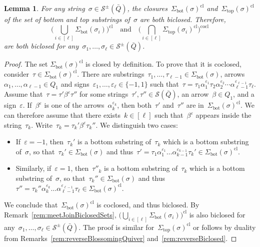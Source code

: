 \documentclass{amsart}
\newtheorem{lemma}[theorem]{Lemma}
\theoremstyle{definition}
\newcommand{\strings}{\mathcal{S}} %
\renewcommand{\top}{\mathrm{top}} %
\newcommand{\bottom}{\mathrm{bot}} %
\newcommand{\closure}[1]{#1^{\mathrm{cl}}} %
\newcommand{\coclosure}[1]{#1^{\mathrm{cocl}}} %
\begin{document}
\begin{lemma}
\label{lem:exmBiclosed}
For any string~$\sigma \in \strings^\pm(\bar Q)$, the closures~$\closure{\Sigma_\bottom(\sigma)}$ and~$\closure{\Sigma_\top(\sigma)}$ of the set of bottom and top substrings of~$\sigma$ are both biclosed.
Therefore,
\[
\closure{\Big( \bigcup_{i \in [\ell]} \Sigma_\bottom(\sigma_i) \Big)}
\quad\text{and}\quad
\coclosure{\Big( \bigcap_{i \in [\ell]} \closure{\Sigma_\top(\sigma_i)} \Big)}
\]
are both biclosed for any~$\sigma_1, \dots, \sigma_\ell \in \strings^\pm(\bar Q)$.
\end{lemma}

\begin{proof}
The set $\closure{\Sigma_\bottom(\sigma)}$ is closed by definition.
To prove that it is coclosed, consider~${\tau \in \closure{\Sigma_\bottom(\sigma)}}$.
There are substrings~$\tau_1, \dots, \tau_{\ell-1} \in \Sigma_\bottom(\sigma)$, arrows~$\alpha_1, \dots, \alpha_{\ell-1} \in Q_1$ and signs~${\varepsilon_1, \dots, \varepsilon_\ell \in \{-1,1\}}$ such that~$\tau = \tau_1 \alpha_1^{\varepsilon_1} \tau_2 \alpha_2^{\varepsilon_2} \cdots \alpha_{\ell-1}^{\varepsilon_{\ell-1}} \tau_\ell$.
Assume that~$\tau = \tau' \beta^\varepsilon \tau''$ for some strings~$\tau', \tau'' \in \strings(\bar Q)$, an arrow~$\beta \in Q_1$, and a sign~$\varepsilon$.
If~$\beta^\varepsilon$ is one of the arrows~$\alpha_k^{\varepsilon_k}$, then both~$\tau'$ and~$\tau''$ are in~$\closure{\Sigma_\bottom(\sigma)}$.
We can therefore assume that there exists~$k \in [\ell]$ such that~$\beta^\varepsilon$ appears inside the string~$\tau_k$.
Write~$\tau_k = \tau_k' \beta^\varepsilon \tau_k''$.
We distinguish two cases:
\begin{itemize}
\item If~$\varepsilon = -1$, then~$\tau_k'$ is a bottom substring of~$\tau_k$ which is a bottom substring of~$\sigma$, so that~$\tau_k' \in \Sigma_\bottom(\sigma)$ and thus~$\tau' = \tau_1 \alpha_1^{\varepsilon_1} \dots \alpha_{k-1}^{\varepsilon_{k-1}} \tau_k' \in \closure{\Sigma_\bottom(\sigma)}$.
\item Similarly, if~$\varepsilon = 1$, then~$\tau''_k$ is a bottom substring of~$\tau_k$ which is a bottom substring of~$\sigma$, so that~$\tau_k'' \in \Sigma_\bottom(\sigma)$ and thus~$\tau'' = \tau_k'' \alpha_k^{\varepsilon_k} \dots \alpha_{\ell-1}^{\varepsilon_{\ell-1}} \tau_\ell \in \closure{\Sigma_\bottom(\sigma)}$.
\end{itemize}
We conclude that~$\closure{\Sigma_\bottom(\sigma)}$ is coclosed, and thus biclosed.
By Remark~\ref{rem:meetJoinBiclosedSets}, $\closure{\big( \bigcup_{i \in [\ell]} \Sigma_\bottom(\sigma_i) \big)}$ is also biclosed for any~$\sigma_1, \dots, \sigma_\ell \in \strings^\pm(\bar Q)$.
The proof is similar for~$\closure{\Sigma_\top(\sigma)}$ or follows by duality from Remarks~\ref{rem:reverseBlossomingQuiver} and~\ref{rem:reverseBiclosed}.
\end{proof}
\end{document}
